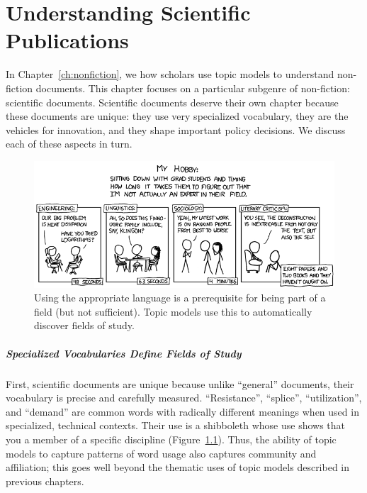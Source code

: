 

\chapter{Understanding Scientific Publications}
\label{ch:sci}

In Chapter~\ref{ch:nonfiction}, we how scholars use topic models to understand
non-fiction documents.  This chapter focuses on a particular subgenre of
non-fiction: scientific documents.  Scientific documents deserve their own
chapter because these documents are unique: they use very specialized
vocabulary, they are the vehicles for innovation, and they shape important
policy decisions.  We discuss each of these aspects in turn.

\begin{figure}
\includegraphics[width=\linewidth]{figures/sci_faking}
\caption{Using the appropriate language is a prerequisite for being
  part of a field (but not sufficient).  Topic models use this to
  automatically discover fields of study.}
\label{fig:faking}
\end{figure}

\paragraph{Specialized Vocabularies Define Fields of Study}

First, scientific documents are unique because unlike ``general'' documents,
their vocabulary is precise and carefully measured.  ``Resistance'', ``splice'',
``utilization'', and ``demand'' are common words with radically different
meanings when used in specialized, technical contexts.  Their use is a
shibboleth whose use shows that you a member of a specific discipline
(Figure~\ref{fig:faking}).  Thus, the ability of topic models to capture
patterns of word usage also captures community and affiliation; this goes well
beyond the thematic uses of topic models described in previous chapters.

